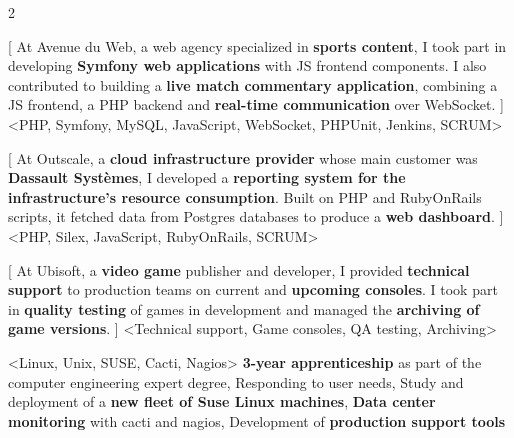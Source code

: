 \begin{paracol}{2}
\begin{leftcolumn}
[
At Avenue du Web, a web agency specialized in \textbf{sports content}, I took part in developing
\textbf{Symfony web applications} with JS frontend components.
I also contributed to building a \textbf{live match commentary application}, combining
a JS frontend, a PHP backend and \textbf{real-time communication} over WebSocket.
]
<PHP, Symfony, MySQL, JavaScript, WebSocket, PHPUnit, Jenkins, SCRUM>
{}

[
At Outscale, a \textbf{cloud infrastructure provider} whose main customer was \textbf{Dassault Systèmes},
I developed a \textbf{reporting system for the infrastructure's resource consumption}. Built
on PHP and RubyOnRails scripts, it fetched data from Postgres databases to produce
a \textbf{web dashboard}.
]
<PHP, Silex, JavaScript, RubyOnRails, SCRUM>
{}

[
At Ubisoft, a \textbf{video game} publisher and developer, I provided \textbf{technical support}
to production teams on current and \textbf{upcoming consoles}.
I took part in \textbf{quality testing} of games in development and managed the \textbf{archiving of game versions}.
]
<Technical support, Game consoles, QA testing, Archiving>
{}

<Linux, Unix, SUSE, Cacti, Nagios>
	{
	\textbf{3-year apprenticeship} as part of the computer engineering expert degree,
	Responding to user needs,
	Study and deployment of a \textbf{new fleet of Suse Linux machines},
	\textbf{Data center monitoring} with cacti and nagios,
	Development of \textbf{production support tools}}

\vspace{12pt}



\vspace{12pt}




\end{leftcolumn}
\end{paracol}
